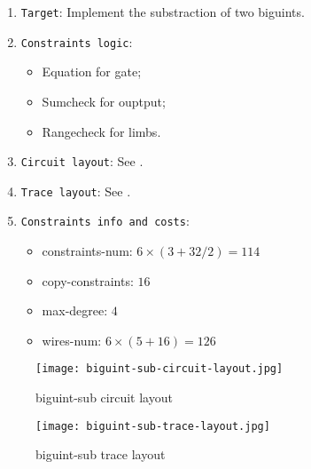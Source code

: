 
\begin{enumerate}
    \item \verb|Target|: Implement the substraction of two biguints.
    \item \verb|Constraints logic|:
    \begin{itemize}
        \item Equation for gate;
        \item Sumcheck for ouptput;
        \item Rangecheck for limbs.
    \end{itemize}
    \item \verb|Circuit layout|: See .
    \item \verb|Trace layout|: See .
    \item \verb|Constraints info and costs|:
    \begin{itemize}
        \item constraints-num: $6 \times (3 + 32 / 2) = 114$
        \item copy-constraints: $16$
        \item max-degree: $4$
        \item wires-num: $6 \times (5 + 16) = 126$
    \end{itemize}
\end{enumerate}

\begin{figure}[!ht]
    \centering
    \texttt{[image: biguint-sub-circuit-layout.jpg]}
    \caption{biguint-sub circuit layout}
    \label{fig:biguint-sub-circuit-layout}
\end{figure}

\begin{figure}[!ht]
    \centering
    \texttt{[image: biguint-sub-trace-layout.jpg]}
    \caption{biguint-sub trace layout}
    \label{fig:biguint-sub-trace-layout}
\end{figure}
